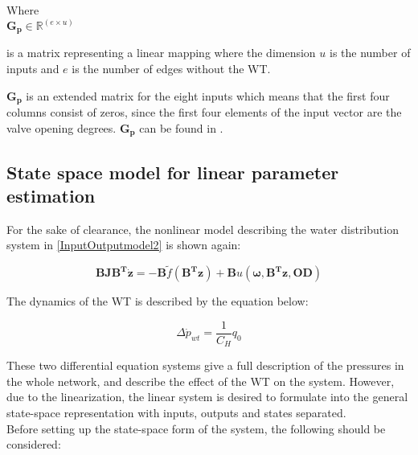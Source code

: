 \begin{minipage}[t]{0.24\textwidth}
Where\\
\hspace*{8mm} $\bm{G_p} \in \bm{\mathbb{R}}^{(e \times u)} $ 
\end{minipage}
\begin{minipage}[t]{0.74\textwidth}
\vspace*{2mm}
is a matrix representing a linear mapping where the dimension $u$ is the number of inputs and $e$ is the number of edges without the WT. 
\end{minipage} 

$\bm{G_p}$ is an extended matrix for the eight inputs which means that the first four columns consist of zeros, since the first four elements of the input vector are the valve opening degrees. $\bm{G_p}$ can be found in .


\subsection{State space model for linear parameter estimation}
 \label{SystemLin}

For the sake of clearance, the nonlinear model describing the water distribution system in \eqref{InputOutputmodel2} is shown again:  

\begin{equation}
\bm{B} \bm{J} \bm{B^T} \bm{\dot{z}} = - \bm{B} \tilde f(\bm{B^T}\bm{z}) + \bm{B} u(\bm{\omega},\bm{B^T}\bm{z},\bm{OD}) 
 \label{InputOutputmodel3}
\end{equation}

The dynamics of the WT is described by the equation below: 

\begin{equation}
\Delta \dot{p}_{wt} = \frac{1}{C_H} q_0
 \label{WT_eq}
\end{equation}

These two differential equation systems give a full description of the pressures in the whole network, and  describe the effect of the WT on the system. However, due to the linearization, the linear system is desired to formulate into the general state-space representation with inputs, outputs and states separated. 
\\
Before setting up the state-space form of the system, the following should be considered: 

